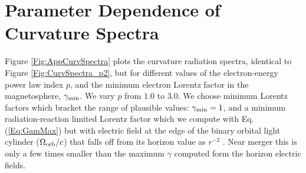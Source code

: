 \section{Parameter Dependence of Curvature Spectra}
\label{AppendixA}
Figure \ref{Fig:AppCurvSpectra} plots the curvature radiation spectra,
identical to Figure \ref{Fig:CurvSpectra_p2}, but for different values
of the electron-energy power law index $p$, and the minimum electron
Lorentz factor in the magnetosphere, $\gamma_{\rm min}$. We vary $p$
from $1.0$ to $3.0$. We choose minimum Lorentz factors which bracket
the range of plausible values: $\gamma_{\rm min}=1$, and a minimum
radiation-reaction limited Lorentz factor which we compute with
Eq. (\ref{Eq:GamMax}) but with electric field at the edge of the
binary orbital light cylinder ($\Omega_{\rm orb}/c$) that falls off
from its horizon value as $r^{-2}$ \citep{MPBook}. Near merger this is
only a few times smaller than the maximum $\gamma$ computed form the
horizon electric fields.
 
